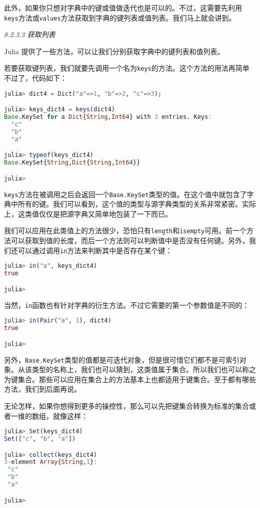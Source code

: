 此外，如果你只想对字典中的键或值做迭代也是可以的。不过，这需要先利用\verb|keys|方法或\verb|values|方法获取到字典的键列表或值列表。我们马上就会讲到。

\textsl{8.2.3.3 获取列表}

Julia 提供了一些方法，可以让我们分别获取字典中的键列表和值列表。

若要获取键列表，我们就要先调用一个名为\verb|keys|的方法。这个方法的用法再简单不过了，代码如下：
\begin{lstlisting}[language=julia]
julia> dict4 = Dict("a"=>1, "b"=>2, "c"=>3);

julia> keys_dict4 = keys(dict4)
Base.KeySet for a Dict{String,Int64} with 3 entries. Keys:
  "c"
  "b"
  "a"

julia> typeof(keys_dict4)
Base.KeySet{String,Dict{String,Int64}}

julia> 
\end{lstlisting}

\verb|keys|方法在被调用之后会返回一个\verb|Base.KeySet|类型的值。在这个值中就包含了字典中所有的键。我们可以看到，这个值的类型与源字典类型的关系非常紧密。实际上，这类值仅仅是把源字典又简单地包装了一下而已。

我们可以应用在此类值上的方法很少，恐怕只有\verb|length|和\verb|isempty|可用。前一个方法可以获取到值的长度，而后一个方法则可以判断值中是否没有任何键。另外，我们还可以通过调用\verb|in|方法来判断其中是否存在某个键：
\begin{lstlisting}[language=julia]
julia> in("a", keys_dict4)
true

julia> 
\end{lstlisting}

当然，\verb|in|函数也有针对字典的衍生方法。不过它需要的第一个参数值是不同的：
\begin{lstlisting}[language=julia]
julia> in(Pair("a", 1), dict4)
true

julia> 
\end{lstlisting}

另外，\verb|Base.KeySet|类型的值都是可迭代对象，但是很可惜它们都不是可索引对象。从该类型的名称上，我们也可以猜到，这类值属于集合。所以我们也可以称之为键集合。那些可以应用在集合上的方法基本上也都适用于键集合。至于都有哪些方法，我们到后面再说。

无论怎样，如果你想得到更多的操控性，那么可以先把键集合转换为标准的集合或者一维的数组，就像这样：
\begin{lstlisting}[language=julia]
julia> Set(keys_dict4)
Set(["c", "b", "a"])

julia> collect(keys_dict4)
3-element Array{String,1}:
 "c"
 "b"
 "a"

julia> 
\end{lstlisting}

